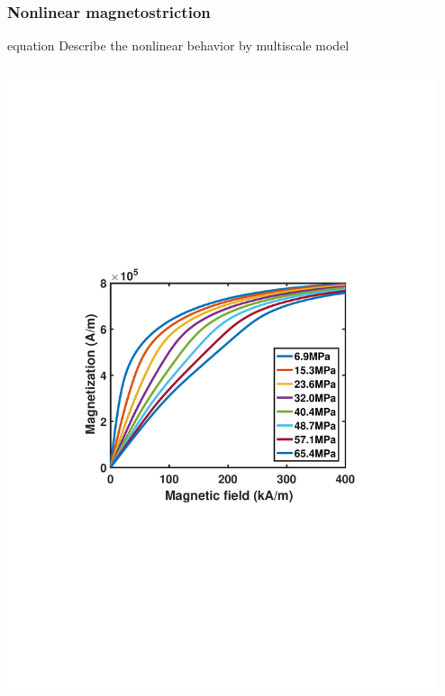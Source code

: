 \documentclass[compress]{beamer}
\begin{document}
\begin{frame}\frametitle{Nonlinear magnetostriction}
\begin{beamercolorbox}[sep=5pt,center]{equation}
     Describe the nonlinear behavior by multiscale model
\end{beamercolorbox}
\begin{columns}[totalwidth=\textwidth] 
   \begin{column}{.5\textwidth}
   \includegraphics[width=0.99\textwidth]{Graphic/02_MHterfenol.pdf}
   \end{column}
   \begin{column}{.5\textwidth} 

\end{column}
\end{columns}
\end{frame}
\end{document}
